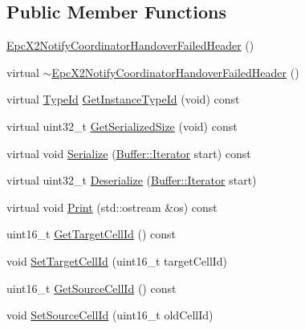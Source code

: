 \subsection*{Public Member Functions}
\begin{DoxyCompactItemize}
\item 
\hyperlink{classns3_1_1EpcX2NotifyCoordinatorHandoverFailedHeader_a2b913ffeac0e23f3cdbf5428c241cdbf}{Epc\+X2\+Notify\+Coordinator\+Handover\+Failed\+Header} ()
\item 
virtual \hyperlink{classns3_1_1EpcX2NotifyCoordinatorHandoverFailedHeader_af1d0a765ae0fdcba5c70a26152507d53}{$\sim$\+Epc\+X2\+Notify\+Coordinator\+Handover\+Failed\+Header} ()
\item 
virtual \hyperlink{classns3_1_1TypeId}{Type\+Id} \hyperlink{classns3_1_1EpcX2NotifyCoordinatorHandoverFailedHeader_a958ad18e808a1597500120ce9e6425a0}{Get\+Instance\+Type\+Id} (void) const 
\item 
virtual uint32\+\_\+t \hyperlink{classns3_1_1EpcX2NotifyCoordinatorHandoverFailedHeader_a6ed4b3a5356ba6c197cb867bb1cde978}{Get\+Serialized\+Size} (void) const 
\item 
virtual void \hyperlink{classns3_1_1EpcX2NotifyCoordinatorHandoverFailedHeader_a28b8a2106ac41ec36d0fbfa8e58c0122}{Serialize} (\hyperlink{classns3_1_1Buffer_1_1Iterator}{Buffer\+::\+Iterator} start) const 
\item 
virtual uint32\+\_\+t \hyperlink{classns3_1_1EpcX2NotifyCoordinatorHandoverFailedHeader_ade11610ac240015248f69f4746f2fed3}{Deserialize} (\hyperlink{classns3_1_1Buffer_1_1Iterator}{Buffer\+::\+Iterator} start)
\item 
virtual void \hyperlink{classns3_1_1EpcX2NotifyCoordinatorHandoverFailedHeader_ab5ad44dde6f43cf1132111d9fba52037}{Print} (std\+::ostream \&os) const 
\item 
uint16\+\_\+t \hyperlink{classns3_1_1EpcX2NotifyCoordinatorHandoverFailedHeader_aeb10cf9834d9b88db2f4b7933dd14420}{Get\+Target\+Cell\+Id} () const 
\item 
void \hyperlink{classns3_1_1EpcX2NotifyCoordinatorHandoverFailedHeader_ae325ebe43e2202ac35f8c6379f13b758}{Set\+Target\+Cell\+Id} (uint16\+\_\+t target\+Cell\+Id)
\item 
uint16\+\_\+t \hyperlink{classns3_1_1EpcX2NotifyCoordinatorHandoverFailedHeader_aaa4c2c60018ff6918458aebfc4507b46}{Get\+Source\+Cell\+Id} () const 
\item 
void \hyperlink{classns3_1_1EpcX2NotifyCoordinatorHandoverFailedHeader_a75e47a7c7697cfff28449995f5c67560}{Set\+Source\+Cell\+Id} (uint16\+\_\+t old\+Cell\+Id)

\end{DoxyCompactItemize}
